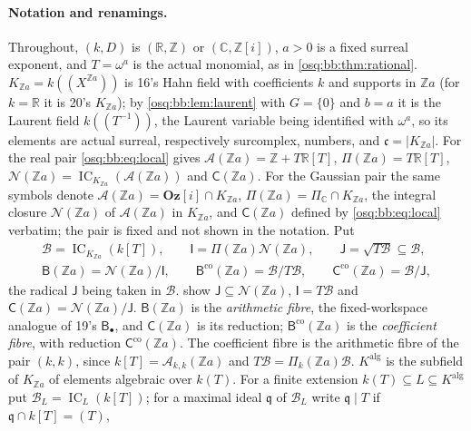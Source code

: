 \documentclass[11pt,letterpaper]{article}
\numberwithin{equation}{section}
\theoremstyle{definition}
\theoremstyle{remark}
\theoremstyle{plain}
\newcommand{\Oz}{\mathbf{Oz}}
\newcommand{\GOz}{\Oz[i]}
\newcommand{\Z}{\mathbb Z}
\newcommand{\R}{\mathbb R}
\newcommand{\C}{\mathbb C}
\newcommand{\A}{\mathcal A}          %
\newcommand{\NN}{\mathcal N}         %
\newcommand{\hahn}[2]{#1(\!(X^{#2})\!)}
\newcommand{\IC}{\operatorname{IC}}
\begin{document}
\paragraph{Notation and renamings.} Throughout, $(k,D)$ is $(\R,\Z)$ or $(\C,\Z[i])$, $a>0$ is a fixed surreal exponent, and $T=\omega^a$ is the
actual monomial, as in \cref{osq:bb:thm:rational}. $K_{\Z a}=\hahn k{\Z a}$ is 16's Hahn field with coefficients $k$ and supports in $\Z a$ (for
$k=\R$ it is 20's $K_{\Z a}$); by \cref{osq:bb:lem:laurent} with $G=\{0\}$ and $b=a$ it is the Laurent field $k(\!(T^{-1})\!)$, the Laurent variable being identified with $\omega^a$, so its elements
are actual surreal, respectively surcomplex, numbers, and $\mathfrak c=|K_{\Z a}|$. For the real pair \eqref{osq:bb:eq:local} gives
$\A(\Z a)=\Z+T\R[T]$, $\Pi(\Z a)=T\R[T]$, $\NN(\Z a)=\IC_{K_{\Z a}}(\A(\Z a))$ and $\mathsf C(\Z a)$. For the Gaussian pair the same symbols
denote $\A(\Z a)=\GOz\cap K_{\Z a}$, $\Pi(\Z a)=\Pi_\C\cap K_{\Z a}$, the integral closure $\NN(\Z a)$ of $\A(\Z a)$ in $K_{\Z a}$, and
$\mathsf C(\Z a)$ defined by \eqref{osq:bb:eq:local} verbatim; the pair is fixed and not shown in the notation. Put
\begin{equation}\label{osq:rm:eq:rings}
 \begin{gathered}
 \mathscr B=\IC_{K_{\Z a}}(k[T]),\qquad \mathsf I=\Pi(\Z a)\NN(\Z a),\qquad \mathsf J=\sqrt{T\mathscr B}\subseteq\mathscr B,\\
 \mathsf B(\Z a)=\NN(\Z a)/\mathsf I,\qquad \mathsf B^{\mathrm{co}}(\Z a)=\mathscr B/T\mathscr B,\qquad \mathsf C^{\mathrm{co}}(\Z a)=\mathscr B/\mathsf J,
 \end{gathered}
\end{equation}
the radical $\mathsf J$ being taken in $\mathscr B$.  show $\mathsf J\subseteq\NN(\Z a)$, $\mathsf I=T\mathscr B$ and
$\mathsf C(\Z a)=\NN(\Z a)/\mathsf J$. $\mathsf B(\Z a)$ is the \emph{arithmetic fibre}, the fixed-workspace analogue of 19's $\mathsf B_\bullet$,
and $\mathsf C(\Z a)$ is its reduction; $\mathsf B^{\mathrm{co}}(\Z a)$ is the \emph{coefficient fibre}, with reduction $\mathsf C^{\mathrm{co}}(\Z a)$.
The coefficient fibre is the arithmetic fibre of the pair $(k,k)$, since $k[T]=\A_{k,k}(\Z a)$ and $T\mathscr B=\Pi_k(\Z a)\mathscr B$.
$K^{\mathrm{alg}}$ is the subfield of $K_{\Z a}$ of elements algebraic over $k(T)$. For a finite extension $k(T)\subseteq L\subseteq K^{\mathrm{alg}}$
put $\mathscr B_L=\IC_L(k[T])$; for a maximal ideal $\mathfrak q$ of $\mathscr B_L$ write $\mathfrak q\mid T$ if $\mathfrak q\cap k[T]=(T)$,
\end{document}
